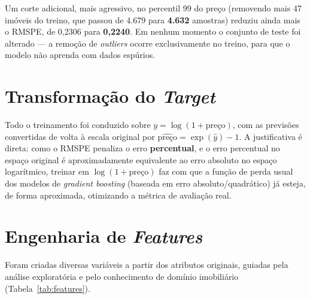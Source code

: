 \documentclass[12pt, a4paper]{article}
\begin{document}
Um corte adicional, mais agressivo, no percentil 99 do preço (removendo mais 47 imóveis do treino, que passou de 4.679 para \textbf{4.632} amostras) reduziu ainda mais o RMSPE, de 0,2306 para \textbf{0,2240}. Em nenhum momento o conjunto de teste foi alterado --- a remoção de \textit{outliers} ocorre exclusivamente no treino, para que o modelo não aprenda com dados espúrios.

\section{Transformação do \textit{Target}}
\label{sec:target}

Todo o treinamento foi conduzido sobre $y = \log(1+\text{preço})$, com as previsões convertidas de volta à escala original por $\hat{\text{preço}} = \exp(\hat{y}) - 1$. A justificativa é direta: como o RMSPE penaliza o erro \textbf{percentual}, e o erro percentual no espaço original é aproximadamente equivalente ao erro absoluto no espaço logarítmico, treinar em $\log(1+\text{preço})$ faz com que a função de perda usual dos modelos de \textit{gradient boosting} (baseada em erro absoluto/quadrático) já esteja, de forma aproximada, otimizando a métrica de avaliação real.

\section{Engenharia de \textit{Features}}
\label{sec:features}

Foram criadas diversas variáveis a partir dos atributos originais, guiadas pela análise exploratória e pelo conhecimento de domínio imobiliário (Tabela~\ref{tab:features}).
\end{document}
